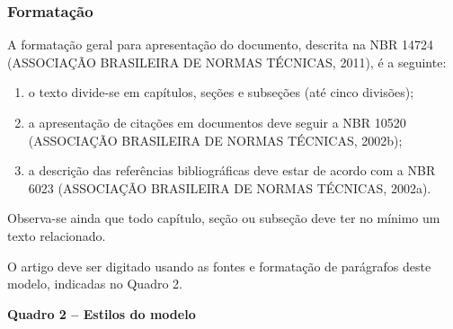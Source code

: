 \subsubsection{Formatação}\label{subsubsec:formatacao}

A formatação geral para apresentação do documento, descrita na NBR 14724
(ASSOCIAÇÃO BRASILEIRA DE NORMAS TÉCNICAS, 2011), é a seguinte:

\begin{enumerate}
\def\labelenumi{\alph{enumi})}
\item
  o texto divide-se em capítulos, seções e subseções (até cinco
  divisões);
\item
  a apresentação de citações em documentos deve seguir a NBR 10520
  (ASSOCIAÇÃO BRASILEIRA DE NORMAS TÉCNICAS, 2002b);
\item
  a descrição das referências bibliográficas deve estar de acordo com a
  NBR 6023 (ASSOCIAÇÃO BRASILEIRA DE NORMAS TÉCNICAS, 2002a).
\end{enumerate}

Observa-se ainda que todo capítulo, seção ou subseção deve ter no mínimo
um texto relacionado.

O artigo deve ser digitado usando as fontes e formatação de parágrafos
deste modelo, indicadas no Quadro 2.

\begin{center}\textbf{Quadro 2 -- Estilos do modelo}\end{center}

